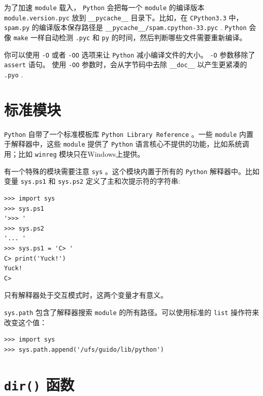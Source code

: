\documentclass[10pt,a4paper,UTF8]{article}
\begin{document}
为了加速 \texttt{module} 载入， \texttt{Python} 会把每一个 \texttt{module} 的编译版本 \texttt{module.version.pyc} 放到 \texttt{\_\_pycache\_\_} 目录下。比如，在 \texttt{CPython3.3} 中， \texttt{spam.py} 的编译版本保存路径是 \texttt{\_\_pycache\_\_/spam.cpython-33.pyc} . \texttt{Python} 会像 \texttt{make} 一样自动检测 \texttt{.pyc} 和 \texttt{py} 的时间，然后判断哪些文件需要重新编译。

你可以使用 \texttt{-O} 或者 \texttt{-OO} 选项来让 \texttt{Python} 减小编译文件的大小。 \texttt{-O} 参数移除了 \texttt{assert} 语句。 使用 \texttt{-OO} 参数时，会从字节码中去除 \texttt{\_\_doc\_\_} 以产生更紧凑的 \texttt{.pyo} .

\section{标准模块}
\label{sec:orgdc23d25}


\texttt{Python} 自带了一个标准模板库 \texttt{Python Library Reference} 。一些 \texttt{module} 内置于解释器中，这些 \texttt{module} 提供了 \texttt{Python} 语言核心不提供的功能，比如系统调用；比如 \texttt{winreg}  模块只在Windows上提供。

有一个特殊的模块需要注意 \texttt{sys} 。这个模块内置于所有的 \texttt{Python} 解释器中。比如 变量 \texttt{sys.ps1} 和 \texttt{sys.ps2} 定义了主和次提示符的字符串:

\begin{verbatim}
>>> import sys
>>> sys.ps1
'>>> '
>>> sys.ps2
'... '
>>> sys.ps1 = 'C> '
C> print('Yuck!')
Yuck!
C>
\end{verbatim}

只有解释器处于交互模式时，这两个变量才有意义。

\texttt{sys.path} 包含了解释器搜索 \texttt{module} 的所有路径。可以使用标准的 \texttt{list} 操作符来改变这个值：
\begin{verbatim}
>>> import sys
>>> sys.path.append('/ufs/guido/lib/python')
\end{verbatim}
\section{\texttt{dir()} 函数}
\label{sec:org64897ed}
\end{document}
